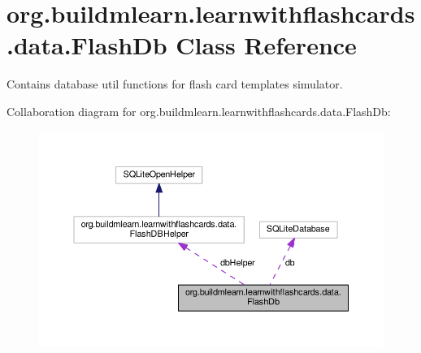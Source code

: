\hypertarget{classorg_1_1buildmlearn_1_1learnwithflashcards_1_1data_1_1FlashDb}{}\section{org.\+buildmlearn.\+learnwithflashcards.\+data.\+Flash\+Db Class Reference}
\label{classorg_1_1buildmlearn_1_1learnwithflashcards_1_1data_1_1FlashDb}


Contains database util functions for flash card template\textquotesingle{}s simulator.  




Collaboration diagram for org.\+buildmlearn.\+learnwithflashcards.\+data.\+Flash\+Db\+:
\nopagebreak
\begin{figure}[H]
\begin{center}
\leavevmode
\includegraphics[width=350pt]{classorg_1_1buildmlearn_1_1learnwithflashcards_1_1data_1_1FlashDb__coll__graph}
\end{center}
\end{figure}
